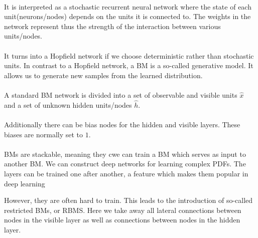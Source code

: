 \documentclass[%
oneside,                 %
final,                   %
10pt]{article}
\begin{document}
\paragraph{}
It is interpreted as a stochastic recurrent neural network where the
state of each unit(neurons/nodes) depends on the units it is connected
to. The weights in the network represent thus the strength of the
interaction between various units/nodes.



\paragraph{}
It turns into a Hopfield network if we choose deterministic rather
than stochastic units. In contrast to a Hopfield network, a BM is a
so-called generative model. It allows us to generate new samples from
the learned distribution.




\paragraph{}
A standard BM network is divided into a set of observable and visible units $\hat{x}$ and a set of unknown hidden units/nodes $\hat{h}$.




\paragraph{}
Additionally there can be bias nodes for the hidden and visible layers. These biases are normally set to $1$.




\paragraph{}
BMs are stackable, meaning they cwe can train a BM which serves as input to another BM. We can construct deep networks for learning complex PDFs. The layers can be trained one after another, a feature which makes them popular in deep learning



However, they are often hard to train. This leads to the introduction of so-called restricted BMs, or RBMS.
Here we take away all lateral connections between nodes in the visible layer as well as connections between nodes in the hidden layer. 
\end{document}
